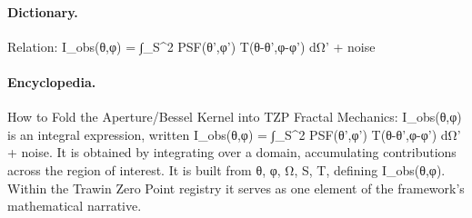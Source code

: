 \paragraph{Dictionary.}
Relation: I\_obs(θ,φ) = ∫\_S\textasciicircum{}2 PSF(θ',φ') T(θ-θ',φ-φ') dΩ' + noise

\paragraph{Encyclopedia.}
How to Fold the Aperture/Bessel Kernel into TZP Fractal Mechanics: I\_obs(θ,φ) is an integral expression, written I\_obs(θ,φ) = ∫\_S\textasciicircum{}2 PSF(θ',φ') T(θ-θ',φ-φ') dΩ' + noise. It is obtained by integrating over a domain, accumulating contributions across the region of interest. It is built from θ, φ, Ω, S, T, defining I\_obs(θ,φ). Within the Trawin Zero Point registry it serves as one element of the framework's mathematical narrative.
